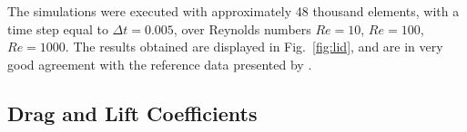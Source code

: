 \documentclass{article}
\begin{document}

The simulations were executed with approximately 48 thousand elements, with a time step equal to $\Delta t = 0.005$, over Reynolds numbers $Re=10$, $Re=100$, $Re=1000$. The results obtained are displayed in Fig.~\ref{fig:lid}, and are in very good agreement with the reference data presented by \citeauthor{marchi2009} \cite{marchi2009}.

\subsection{Drag and Lift Coefficients}
\end{document}
